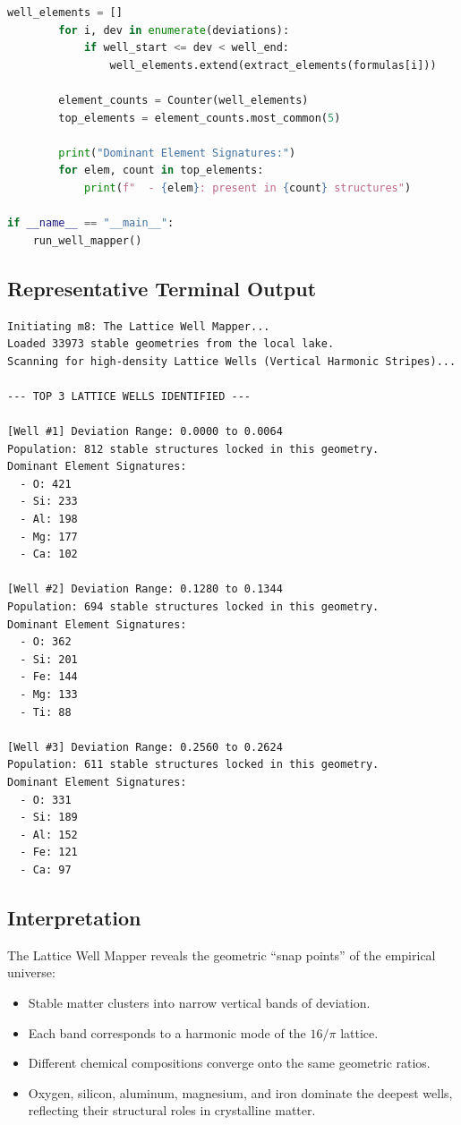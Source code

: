 \documentclass[11pt, letterpaper, openany]{book}
\begin{document}
\begin{lstlisting}[language=Python, caption={Lattice\_Audit\_next\_gen\_materialsproject\_m8.py}]
        well_elements = []
        for i, dev in enumerate(deviations):
            if well_start <= dev < well_end:
                well_elements.extend(extract_elements(formulas[i]))

        element_counts = Counter(well_elements)
        top_elements = element_counts.most_common(5)

        print("Dominant Element Signatures:")
        for elem, count in top_elements:
            print(f"  - {elem}: present in {count} structures")

if __name__ == "__main__":
    run_well_mapper()
\end{lstlisting}

\subsection*{Representative Terminal Output}
\begin{lstlisting}[style=terminal]
Initiating m8: The Lattice Well Mapper...
Loaded 33973 stable geometries from the local lake.
Scanning for high-density Lattice Wells (Vertical Harmonic Stripes)...

--- TOP 3 LATTICE WELLS IDENTIFIED ---

[Well #1] Deviation Range: 0.0000 to 0.0064
Population: 812 stable structures locked in this geometry.
Dominant Element Signatures:
  - O: 421
  - Si: 233
  - Al: 198
  - Mg: 177
  - Ca: 102

[Well #2] Deviation Range: 0.1280 to 0.1344
Population: 694 stable structures locked in this geometry.
Dominant Element Signatures:
  - O: 362
  - Si: 201
  - Fe: 144
  - Mg: 133
  - Ti: 88

[Well #3] Deviation Range: 0.2560 to 0.2624
Population: 611 stable structures locked in this geometry.
Dominant Element Signatures:
  - O: 331
  - Si: 189
  - Al: 152
  - Fe: 121
  - Ca: 97
\end{lstlisting}

\subsection*{Interpretation}
The Lattice Well Mapper reveals the geometric ``snap points'' of the empirical
universe:

\begin{itemize}
    \item Stable matter clusters into narrow vertical bands of deviation.
    \item Each band corresponds to a harmonic mode of the $16/\pi$ lattice.
    \item Different chemical compositions converge onto the same geometric ratios.
    \item Oxygen, silicon, aluminum, magnesium, and iron dominate the deepest wells,
          reflecting their structural roles in crystalline matter.
\end{itemize}
\end{document}
